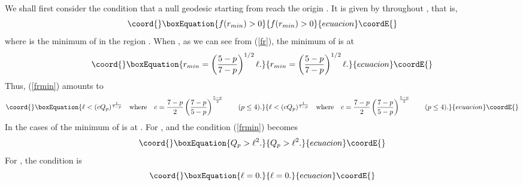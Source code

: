 \documentclass[a4paper,12pt]{article}
\begin{document}
We shall first consider the condition that a null geodesic
starting from \coordHE{} reach the origin \coordHE{}.
It is given by \coordHE{} throughout \coordHE{}, 
that is,
\begin{equation}\coord{}\boxEquation{
f(r_{min})>0
\label{frmin}
}{
f(r_{min})>0
}{ecuacion}\coordE{}\end{equation}
where \coordHE{} is the minimum of \coordHE{} in the
region \coordHE{}.
When \coordHE{}, as we can see from (\ref{fr}),  
the minimum of \coordHE{} is at
\begin{equation}\coord{}\boxEquation{
r_{min}=\left({5-p\over 7-p}\right)^{1/2}\ell.
}{
r_{min}=\left({5-p\over 7-p}\right)^{1/2}\ell.
}{ecuacion}\coordE{}\end{equation}
Thus, (\ref{frmin}) amounts to
\begin{equation}\coord{}\boxEquation{
\ell< (c Q_{p})^{1\over 7-p} \quad \mbox{where}\quad 
c={7-p\over 2}\left({7-p\over 5-p}\right)^{5-p\over 2}
\qquad (p\le4).
\label{geodcond}
}{
\ell< (c Q_{p})^{1\over 7-p} \quad \mbox{where}\quad 
c={7-p\over 2}\left({7-p\over 5-p}\right)^{5-p\over 2}
\qquad (p\le4).
}{ecuacion}\coordE{}\end{equation}
In the cases of \coordHE{} the minimum of \coordHE{} is at \coordHE{}.
For \coordHE{}, \coordHE{} and the condition (\ref{frmin})
becomes
\begin{equation}\coord{}\boxEquation{
Q_{p}> \ell^2. 
}{
Q_{p}> \ell^2. 
}{ecuacion}\coordE{}\end{equation}
For \coordHE{}, the condition is 
\begin{equation}\coord{}\boxEquation{
\ell=0.
}{
\ell=0.
}{ecuacion}\coordE{}\end{equation}
\end{document}
